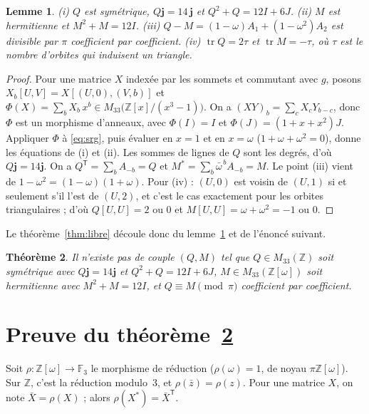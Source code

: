 \documentclass[11pt,a4paper]{article}
\newtheorem{theorem}{Théorème}
\newtheorem{lemma}[theorem]{Lemme}
\theoremstyle{remark}
\newcommand{\Z}{\mathbb{Z}}
\newcommand{\F}{\mathbb{F}}
\newcommand{\one}{\mathbf{j}}
\newcommand{\tr}{\operatorname{tr}}
\begin{document}
\begin{lemma}\label{lem:QM}
(i) $Q$ est symétrique, $Q\one=14\,\one$ et $Q^2+Q=12I+6J$.
(ii) $M$ est hermitienne et $M^2+M=12I$.
(iii) $Q-M=(1-\omega)A_1+(1-\omega^2)A_2$ est divisible par $\pi$ coefficient par coefficient.
(iv) $\tr Q=2\tau$ et $\tr M=-\tau$, où $\tau$ est le nombre d'orbites qui induisent un triangle.
\end{lemma}
\begin{proof}
Pour une matrice $X$ indexée par les sommets et commutant avec $g$, posons $X_b[U,V]=X[(U,0),(V,b)]$ et
$\Phi(X)=\sum_b X_b\,x^b\in M_{33}\bigl(\Z[x]/(x^3-1)\bigr)$. On a $(XY)_b=\sum_c X_cY_{b-c}$, donc $\Phi$ est un morphisme d'anneaux,
avec $\Phi(I)=I$ et $\Phi(J)=(1+x+x^2)J$. Appliquer $\Phi$ à \eqref{eq:srg}, puis évaluer en $x=1$ et en $x=\omega$
($1+\omega+\omega^2=0$), donne les équations de (i) et (ii). Les sommes de lignes de $Q$ sont les degrés, d'où $Q\one=14\one$.
On a $Q^{\mathsf T}=\sum_b A_{-b}=Q$ et $M^*=\sum_b\bar\omega^{\,b}A_{-b}=M$. Le point (iii) vient de $1-\omega^2=(1-\omega)(1+\omega)$.
Pour (iv) : $(U,0)$ est voisin de $(U,1)$ si et seulement s'il l'est de $(U,2)$, et c'est le cas exactement pour les orbites
triangulaires ; d'où $Q[U,U]=2$ ou $0$ et $M[U,U]=\omega+\omega^2=-1$ ou $0$.
\end{proof}

Le théorème~\ref{thm:libre} découle donc du lemme~\ref{lem:QM} et de l'énoncé suivant.

\begin{theorem}\label{thm:matrices}
Il n'existe pas de couple $(Q,M)$ tel que
$Q\in M_{33}(\Z)$ soit symétrique avec $Q\one=14\one$ et $Q^2+Q=12I+6J$, $M\in M_{33}(\Z[\omega])$ soit hermitienne avec $M^2+M=12I$,
et $Q\equiv M\pmod{\pi}$ coefficient par coefficient.
\end{theorem}

\section{Preuve du théorème~\ref{thm:matrices}}

Soit $\rho:\Z[\omega]\to\F_3$ le morphisme de réduction ($\rho(\omega)=1$, de noyau $\pi\Z[\omega]$). Sur $\Z$, c'est la
réduction modulo~3, et $\rho(\bar z)=\rho(z)$. Pour une matrice $X$, on note $\bar X=\rho(X)$ ; alors $\rho(X^*)=\bar X^{\mathsf T}$.
\end{document}
